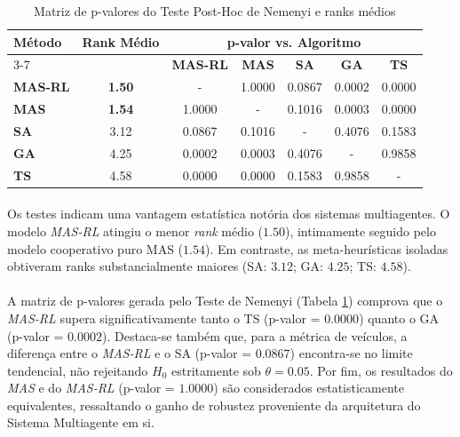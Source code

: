 \begin{table}[htbp]
    \centering
    \caption[\small{Matriz de p-valores do Teste Post-Hoc de Nemenyi e ranks médios}]{\label{tab:nemenyi_pvalues} \small{Matriz de p-valores do Teste Post-Hoc de Nemenyi e ranks médios}}
    \begin{tabular}{lcccccc}
        \toprule
        \multirow{2}{*}{\textbf{Método}} & \multirow{2}{*}{\textbf{Rank Médio}} & \multicolumn{5}{c}{\textbf{p-valor vs. Algoritmo}} \\
        \cmidrule(lr){3-7}
        & & \textbf{MAS-RL} & \textbf{MAS} & \textbf{SA} & \textbf{GA} & \textbf{TS} \\
        \midrule
        \textbf{MAS-RL} & \textbf{1.50} & -      & 1.0000 & 0.0867 & 0.0002 & 0.0000 \\
        \textbf{MAS}     & \textbf{1.54} & 1.0000 & -      & 0.1016 & 0.0003 & 0.0000 \\
        \textbf{SA}      & 3.12 & 0.0867 & 0.1016 & -      & 0.4076 & 0.1583 \\
        \textbf{GA}      & 4.25 & 0.0002 & 0.0003 & 0.4076 & -      & 0.9858 \\
        \textbf{TS}      & 4.58 & 0.0000 & 0.0000 & 0.1583 & 0.9858 & -      \\
        \bottomrule
    \end{tabular}
\end{table}

\paragraph{} Os testes indicam uma vantagem estatística notória dos sistemas multiagentes. O modelo \textit{MAS-RL} atingiu o menor \textit{rank} médio ($1.50$), intimamente seguido pelo modelo cooperativo puro MAS ($1.54$). Em contraste, as meta-heurísticas isoladas obtiveram ranks substancialmente maiores (SA: $3.12$; GA: $4.25$; TS: $4.58$).

\paragraph{} A matriz de p-valores gerada pelo Teste de Nemenyi (Tabela \ref{tab:nemenyi_pvalues}) comprova que o \textit{MAS-RL} supera significativamente tanto o TS (p-valor = $0.0000$) quanto o GA (p-valor = $0.0002$). Destaca-se também que, para a métrica de veículos, a diferença entre o \textit{MAS-RL} e o SA (p-valor = $0.0867$) encontra-se no limite tendencial, não rejeitando $H_0$ estritamente sob $\theta = 0.05$. Por fim, os resultados do \textit{MAS} e do \textit{MAS-RL} (p-valor = $1.0000$) são considerados estatisticamente equivalentes, ressaltando o ganho de robustez proveniente da arquitetura do Sistema Multiagente em si.

